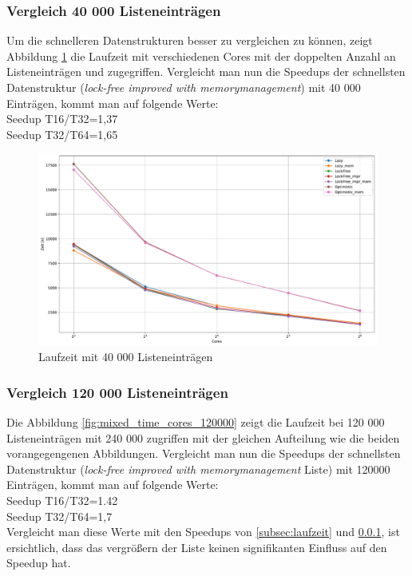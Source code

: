  \subsubsection{Vergleich 40 000 Listeneinträgen}
 \label{subsub:Vergleich_40000}
 Um die schnelleren Datenstrukturen besser zu vergleichen zu können, zeigt Abbildung \ref{fig:mixed_time_cores_40000} die Laufzeit mit verschiedenen Cores
mit der doppelten Anzahl an Listeneinträgen und zugegriffen. 
Vergleicht man nun die Speedups der schnellsten Datenstruktur (\textit{lock-free improved with memorymanagement})
mit 40 000 Einträgen, kommt man auf folgende Werte:
\\Seedup T16/T32=1,37
\\Seedup T32/T64=1,65


\begin{figure}[H]
	\centering
	\includegraphics[width=1.0\linewidth]{./plots_pdf/mixed_time_cores_40000.pdf} 
	\caption{Laufzeit mit 40 000 Listeneinträgen}
	\label{fig:mixed_time_cores_40000} 
\end{figure}

\subsubsection{Vergleich 120 000 Listeneinträgen}
Die Abbildung \ref{fig:mixed_time_cores_120000} zeigt die Laufzeit bei
120 000 Listeneinträgen mit 240 000 zugriffen mit der gleichen Aufteilung wie die beiden vorangegengenen Abbildungen.
Vergleicht man nun die Speedups der schnellsten Datenstruktur (\textit{lock-free improved with memorymanagement} Liste)
mit 120000 Einträgen, kommt man auf folgende Werte:
\\Seedup T16/T32=1.42
\\Seedup T32/T64=1,7
\\ Vergleicht man diese Werte mit den Speedups von \ref{subsec:laufzeit} und \ref{subsub:Vergleich_40000}, 
ist ersichtlich, dass das vergrößern der Liste keinen signifikanten Einfluss auf den Speedup hat. 



